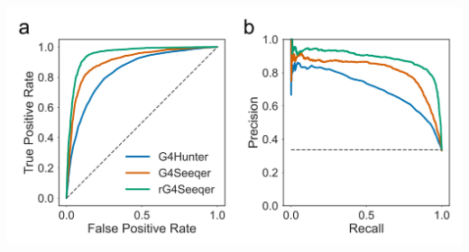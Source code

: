 \documentclass[12pt,a4paper,]{report}
\let\origfigure=\figure
\let\endorigfigure=\endfigure
\renewenvironment{figure}[1][2] {
    \expandafter\origfigure\expandafter[H]
} {
    \endorigfigure
}
\begin{document}
\newpage

\begin{figure}[htbp]
\centering
\includegraphics[width=\textwidth,height=562pt,keepaspectratio]{chapter_3/figures/rg4seq_test_set_roc_pr.png}
\caption[Validation curves for rG4Seeqer method]{\textbf{Validation   curves   for   rG4Seeqer   method}   \textbf{a)}   Receiver   Operator   Characteristic   (ROC)   curves   showing   the   performance   of   rG4Seeqer,   G4Seeqer   and   the   G4Hunter   method   (Bedrat   et   al. 2016),   on   a   held   out   test   set   of   the   rG4Seq   dataset   (10\%   of   total   dataset).   \textbf{b)}   Precision-recall   curves   showing   the   performance   of   rG4Seeqer,   G4Seeqer,   and   G4Hunter   on   the   same   dataset.   \label{rG4seeqer_test}}
\end{figure}
\end{document}
